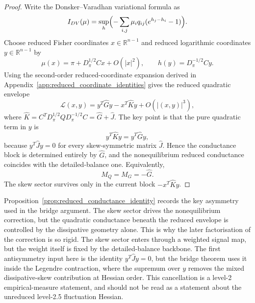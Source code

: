 \documentclass[11pt,a4paper]{article}
\numberwithin{equation}{section}
\theoremstyle{thmcompact}
\theoremstyle{remark}
\begin{document}
\begin{proof}
Write the Donsker--Varadhan variational formula as \cite{DonskerVaradhan1975a,DonskerVaradhan1975b,Touchette2009}
\begin{equation}
I_{DV}(\mu)=\sup_h\Bigl(-\sum_{i,j}\mu_i q_{ij}(e^{h_j-h_i}-1)\Bigr).
\end{equation}
Choose reduced Fisher coordinates \(x\in\mathbb R^{n-1}\) and reduced logarithmic coordinates \(y\in\mathbb R^{n-1}\) by
\begin{equation}
\mu(x)=\pi+D_\pi^{1/2}Cx+O(|x|^2),
\qquad
h(y)=D_\pi^{-1/2}Cy.
\end{equation}
Using the second-order reduced-coordinate expansion derived in Appendix~\ref{app:reduced_coordinate_identities} gives the reduced quadratic envelope
\begin{equation}
\mathcal L(x,y)=y^T\widehat G y-x^T\widehat K y+O(|(x,y)|^3),
\end{equation}
where \(\widehat K=C^TD_\pi^{1/2}QD_\pi^{-1/2}C=\widehat G+\widehat J\). The key point is that the pure quadratic term in \(y\) is
\begin{equation}
y^T\widehat K y=y^T\widehat G y,
\end{equation}
because \(y^T\widehat J y=0\) for every skew-symmetric matrix \(\widehat J\). Hence the conductance block is determined entirely by \(\widehat G\), and the nonequilibrium reduced conductance coincides with the detailed-balance one. Equivalently,
\begin{equation}
M_Q=M_G=-\widehat G.
\end{equation}
The skew sector survives only in the current block \(-x^T\widehat K y\).
\end{proof}

Proposition~\ref{prop:reduced_conductance_identity} records the key asymmetry used in the bridge argument. The skew sector drives the nonequilibrium correction, but the quadratic conductance beneath the reduced envelope is controlled by the dissipative geometry alone. This is why the later factorisation of the correction is so rigid. The skew sector enters through a weighted signal map, but the weight itself is fixed by the detailed-balance backbone. The first antisymmetry input here is the identity \(y^T\widehat J y=0\), but the bridge theorem uses it inside the Legendre contraction, where the supremum over \(y\) removes the mixed dissipative-skew contribution at Hessian order. This cancellation is a level-2 empirical-measure statement, and should not be read as a statement about the unreduced level-2.5 fluctuation Hessian.
\end{document}
